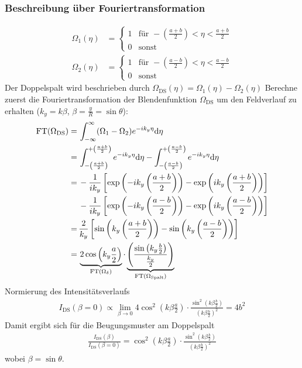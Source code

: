 \subsubsection{Beschreibung über Fouriertransformation}
\begin{align*}
  \Omega_1(\eta) 
  &= \begin{cases}
    1 & \text{für } 
    -\left(\frac{a+b}{2}\right) < \eta < \frac{a+b}{2}\\
    0 & \text{sonst}
  \end{cases}\\
  \Omega_2(\eta) 
  &= \begin{cases}
    1 & \text{für } 
    -\left(\frac{a-b}{2}\right) < \eta < \frac{a-b}{2}\\
    0 & \text{sonst}
  \end{cases}    
\end{align*}
Der Doppelspalt wird beschrieben durch 
$\Omega_\text{DS}(\eta)=\Omega_1(\eta)-\Omega_2(\eta)$
Berechne zuerst die Fouriertransformation der Blendenfunktion
$\Omega_\text{DS}$ um den Feldverlauf zu erhalten
($k_y=k\beta$, $\beta=\frac{y}{R}=\sin\theta$):
\begin{align*}
  \operatorname{FT}(\Omega_\text{DS}) 
  =\, &\int_{-\infty}^{\infty} 
        (\Omega_1-\Omega_2) e^{-ik_y\eta} \mathrm{d}\eta \\
  =\, &\int_{-\left(\frac{a+b}{2}\right)}^{+\left(\frac{a+b}{2}\right)}
        e^{-ik_y\eta} \mathrm{d}\eta 
        -  \int_{-\left(\frac{a-b}{2}\right)}^{+\left(\frac{a-b}{2}\right)}
        e^{-ik_y\eta} \mathrm{d}\eta \\
  =\, &-\frac{1}{ik_y} \left[
        \exp\left( -ik_y\left(\frac{a+b}{2}\right) \right)
        -\exp\left( ik_y\left(\frac{a+b}{2}\right) \right)
        \right]\\
      &-\frac{1}{ik_y} \left[
        \exp\left( -ik_y\left(\frac{a-b}{2}\right) \right)
        -\exp\left( ik_y\left(\frac{a-b}{2}\right) \right)
        \right]\\
  =\, &\frac{2}{k_y}\left[
        \sin\left(  k_y\left(\frac{a+b}{2}\right) \right)
        -\sin\left( k_y\left(\frac{a-b}{2}\right) \right)
        \right] \\
  =\, &\underbrace{ 2\cos\left( k_y\frac{a}{2} \right) }_{\operatorname{FT}(\Omega_\delta)}
        \cdot \underbrace{ \left(
        \frac{ \sin\left( k_y\frac{b}{2} \right) }{ \frac{k_y}{2} }
        \right) }_{\operatorname{FT}(\Omega_\text{Spalt})}
\end{align*}
Normierung des Intensitätsverlaufs
\begin{gather*}
  I_\text{DS}(\beta=0) 
  \propto \lim_{\beta\to 0} 
  4\cos^2\left( k\beta\frac{a}{2} \right)
  \cdot \frac
  { \sin^2\left( k\beta\frac{b}{2} \right) }
  { \left(k\beta\frac{b}{2}\right)^2 }
  = 4b^2
\end{gather*}
Damit ergibt sich für die Beugungsmuster am Doppelspalt
\begin{gather*}
  \frac{ I_\text{DS}(\beta) }{ I_\text{DS}(\beta=0) }
  = \cos^2\left( k\beta\frac{a}{2} \right)
  \cdot \frac
  { \sin^2\left( k\beta\frac{b}{2} \right) }
  {       \left( k\beta\frac{b}{2} \right)^2 }
\end{gather*}
wobei $\beta=\sin\theta$.

